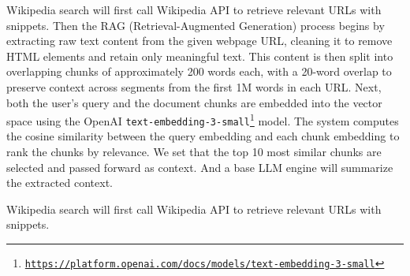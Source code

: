 Wikipedia search will first call Wikipedia API to retrieve relevant URLs with snippets. Then the RAG (Retrieval-Augmented Generation) process begins by extracting raw text content from the given webpage URL, cleaning it to remove HTML elements and retain only meaningful text. This content is then split into overlapping chunks of approximately 200 words each, with a 20-word overlap to preserve context across segments from the first 1M words in each URL. Next, both the user's query and the document chunks are embedded into the vector space using the OpenAI \texttt{text-embedding-3-small\footnote{\url{https://platform.openai.com/docs/models/text-embedding-3-small}}} model. The system computes the cosine similarity between the query embedding and each chunk embedding to rank the chunks by relevance. We set that the top 10 most similar chunks are selected and passed forward as context. And a base LLM engine will summarize the extracted context. 

Wikipedia search will first call Wikipedia API to retrieve relevant URLs with snippets. 

